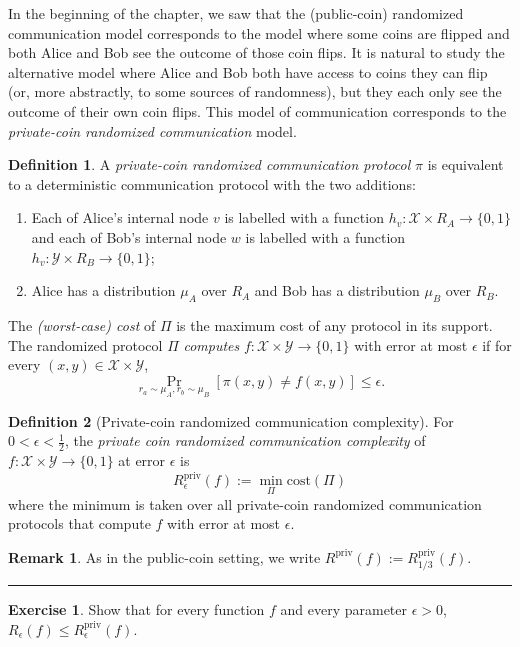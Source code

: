 \documentclass[11pt]{amsart}
\theoremstyle{plain}
\theoremstyle{definition}
\newtheorem{definition}{Definition}
\newtheorem{exercise}{Exercise}
\newtheorem{remark}{Remark}
\theoremstyle{plain}
\newcommand{\calX}{\mathcal{X}}
\newcommand{\calY}{\mathcal{Y}}
\newcommand{\cost}{\mathrm{cost}}
\newcommand{\Rpriv}{R^{\mathrm{priv}}}
\newcommand{\exercises}{\bigskip \noindent\rule{8cm}{0.4pt} \medskip}
\begin{document}
In the beginning of the chapter, we saw that the (public-coin) randomized communication model corresponds to the model where some coins are flipped and both Alice and Bob see the outcome of those coin flips. It is natural to study the alternative model where Alice and Bob both have access to coins they can flip (or, more abstractly, to some sources of randomness), but they each only see the outcome of their own coin flips. This model of communication corresponds to the \emph{private-coin randomized communication} model.

\begin{definition}
A \emph{private-coin randomized communication protocol} $\pi$ is equivalent to a deterministic communication protocol with the two additions: 
\begin{enumerate}
\item Each of Alice's internal node $v$ is labelled with a function $h_v : \calX \times R_A \to \{0,1\}$ and each of Bob's internal node $w$ is labelled with a function $h_v : \calY \times R_B \to \{0,1\}$; 
\item Alice has a distribution $\mu_A$ over $R_A$ and Bob has a distribution $\mu_B$ over $R_B$.
\end{enumerate}
The \emph{(worst-case) cost} of $\Pi$ is the maximum cost of any protocol in its support. The randomized protocol $\Pi$ \emph{computes} $f : \calX \times \calY \to \{0,1\}$ with error at most $\epsilon$ if for every $(x,y) \in \calX \times \calY$,
\[
\Pr_{r_a \sim \mu_A, r_b \sim \mu_B}[ \pi(x,y) \neq f(x,y) ] \le \epsilon.
\]
\end{definition}


\begin{definition}[Private-coin randomized communication complexity]
For $0 < \epsilon < \frac12$, the \emph{private coin randomized communication complexity} of $f : \calX \times \calY \to \{0,1\}$ at error $\epsilon$ is
\[
\Rpriv_\epsilon(f) := \min_{\Pi} \cost(\Pi)
\]
where the minimum is taken over all private-coin randomized communication protocols that compute $f$ with error at most $\epsilon$.
\end{definition}

\begin{remark}
As in the public-coin setting, we write $\Rpriv(f) := \Rpriv_{1/3}(f)$.
\end{remark}
\exercises

\begin{exercise}
Show that for every function $f$ and every parameter $\epsilon > 0$, 
$R_\epsilon(f) \le \Rpriv_\epsilon(f)$.
\end{exercise}
\end{document}
